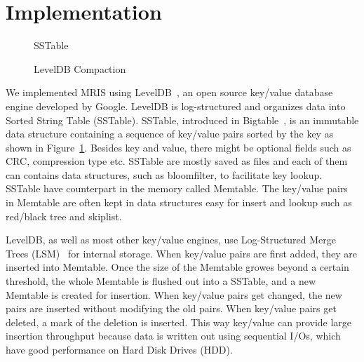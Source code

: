 \section{Implementation}
\label{sec:implementation}

\begin{figure}[t]
\begin{centering}
\caption{SSTable}
\label{fig:sstable}
\end{centering}
\end{figure}

\begin{figure}[t]
\begin{centering}
\caption{LevelDB Compaction}
\label{fig:compact}
\end{centering}
\end{figure}

We implemented MRIS using LevelDB~\cite{leveldb-web}, an open source
key/value database engine developed by Google. LevelDB is
log-structured and organizes data into Sorted String Table (SSTable).
SSTable, introduced in Bigtable~\cite{chang06osdi}, is an immutable
data structure containing a sequence of key/value pairs sorted by the
key as shown in Figure~\ref{fig:sstable}. Besides key and value, there
might be optional fields such as CRC, compression type etc. SSTable
are mostly saved as files and each of them can contains data
structures, such as bloomfilter, to facilitate key lookup. SSTable
have counterpart in the memory called Memtable. The key/value pairs in
Memtable are often kept in data structures easy for insert and lookup
such as red/black tree and skiplist.

LevelDB, as well as most other key/value engines, use Log-Structured
Merge Trees (LSM)~\cite{lsm} for internal storage. When key/value
pairs are first added, they are inserted into Memtable.  Once the size
of the Memtable growes beyond a certain threshold, the whole Memtable
is flushed out into a SSTable, and a new Memtable is created for
insertion. When key/value pairs get changed, the new pairs are
inserted without modifying the old pairs. When key/value pairs get
deleted, a mark of the deletion is inserted. This way key/value can
provide large insertion throughput because data is written out using
sequential I/Os, which have good performance on Hard Disk Drives
(HDD). 

